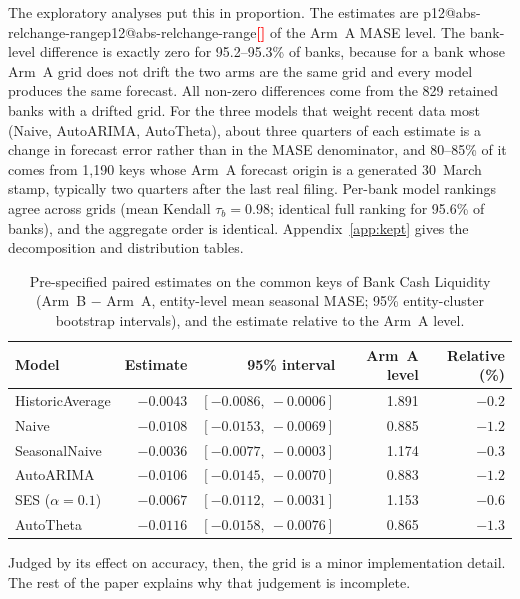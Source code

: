 \documentclass[11pt]{article}
\makeatletter
\newcommand{\val}[1]{\ifcsname p12@#1\endcsname\csname p12@#1\endcsname\else\textcolor{red}{\textbf{[\detokenize{#1}]}}\fi}
\makeatother
\begin{document}
The exploratory analyses put this in proportion. The estimates are \val{abs-relchange-range} of the Arm~A MASE level. The bank-level difference is exactly zero for 95.2--95.3\% of banks, because for a bank whose Arm~A grid does not drift the two arms are the same grid and every model produces the same forecast. All non-zero differences come from the 829 retained banks with a drifted grid. For the three models that weight recent data most (Naive, AutoARIMA, AutoTheta), about three quarters of each estimate is a change in forecast error rather than in the MASE denominator, and 80--85\% of it comes from 1,190 keys whose Arm~A forecast origin is a generated 30~March stamp, typically two quarters after the last real filing. Per-bank model rankings agree across grids (mean Kendall $\tau_b=0.98$; identical full ranking for 95.6\% of banks), and the aggregate order is identical. Appendix~\ref{app:kept} gives the decomposition and distribution tables.

\begin{table}[t]
\centering\small
\caption{Pre-specified paired estimates on the common keys of Bank Cash Liquidity (Arm~B $-$ Arm~A, entity-level mean seasonal MASE; 95\% entity-cluster bootstrap intervals), and the estimate relative to the Arm~A level.}\label{tab:kept}
\begin{tabular}{lrrrr}
\toprule
Model & Estimate & 95\% interval & Arm~A level & Relative (\%) \\
\midrule
HistoricAverage & $-0.0043$ & $[-0.0086,\ -0.0006]$ & 1.891 & $-0.2$ \\
Naive & $-0.0108$ & $[-0.0153,\ -0.0069]$ & 0.885 & $-1.2$ \\
SeasonalNaive & $-0.0036$ & $[-0.0077,\ -0.0003]$ & 1.174 & $-0.3$ \\
AutoARIMA & $-0.0106$ & $[-0.0145,\ -0.0070]$ & 0.883 & $-1.2$ \\
SES ($\alpha=0.1$) & $-0.0067$ & $[-0.0112,\ -0.0031]$ & 1.153 & $-0.6$ \\
AutoTheta & $-0.0116$ & $[-0.0158,\ -0.0076]$ & 0.865 & $-1.3$ \\
\bottomrule
\end{tabular}
\end{table}

Judged by its effect on accuracy, then, the grid is a minor implementation detail. The rest of the paper explains why that judgement is incomplete.

\end{document}
